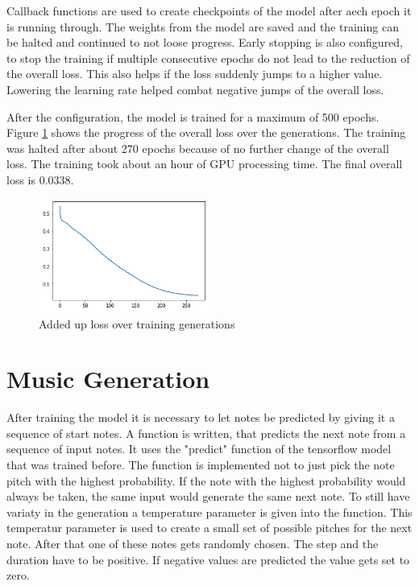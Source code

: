 Callback functions are used to create checkpoints of the model after aech epoch it is running through. The weights from the model
are saved and the training can be halted and continued to not loose progress. Early stopping is also configured, to stop the 
training if multiple consecutive epochs do not lead to the reduction of the overall loss. This also helps if the loss suddenly
jumps to a higher value. Lowering the learning rate helped combat negative jumps of the overall loss.

After the configuration, the model is trained for a maximum of 500 epochs. Figure \ref{fig:loss} shows the progress of the 
overall loss over the generations. The training was halted after about 270 epochs because of no further change of the overall loss.
The training took about an hour of GPU processing time. The final overall loss is 0.0338.


\begin{figure}
\centering
\includegraphics[width=0.5\textwidth]{./pics/Loss.PNG}
\caption{Added up loss over training generations}
\label{fig:loss}    
\end{figure}

\section{Music Generation}
\label{gen}

After training the model it is necessary to let notes be predicted by giving it a sequence of start notes. A function is 
written, that predicts the next note from a sequence of input notes. It uses the "predict" function of the tensorflow
model that was trained before. The function is implemented not to just pick the note pitch with the highest probability.
If the note with the highest probability would always be taken, the same input would generate the same next note. 
To still have variaty in the generation a temperature parameter is given into the function. This temperatur parameter is used
to create a small set of possible pitches for the next note. After that one of these notes gets randomly chosen.
The step and the duration have to be positive. If negative values are predicted the value gets set to zero.

